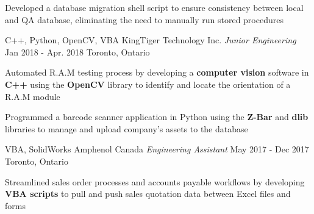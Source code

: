 \begin{siderules}
\begin{cventries}
{\begin{cvitems}
          \item {Developed a database migration shell script to ensure consistency between local and QA database, eliminating the need to manually run stored procedures}
        \end{cvitems}
      }
    \cventry
      {C++, Python, OpenCV, VBA}
      {KingTiger Technology Inc. \hspace{0.15em} \bodyfontlight\itshape{Junior Engineering}}
      {Jan 2018 - Apr. 2018}
      {Toronto, Ontario}
      {
        \begin{cvitems}
          \item {Automated R.A.M testing process by developing a \textbf{computer vision} software in \textbf{C++} using the \textbf{OpenCV} library to identify and locate the orientation of a R.A.M module}
          \item {Programmed a barcode scanner application in Python using the \textbf{Z-Bar} and \textbf{dlib} libraries to manage and upload company’s assets to the database}
        \end{cvitems}
      }
    \cventry
      {VBA, SolidWorks}
      {Amphenol Canada \hspace{0.15em} \bodyfontlight\itshape{Engineering Assistant}}
      {May 2017 - Dec 2017}
      {Toronto, Ontario}
      {
        \begin{cvitems}
          \item {Streamlined sales order processes and accounts payable workflows by developing \textbf{VBA scripts} to pull and push sales quotation data between Excel files and forms}
        \end{cvitems}
      }
  \end{cventries}
\end{siderules}